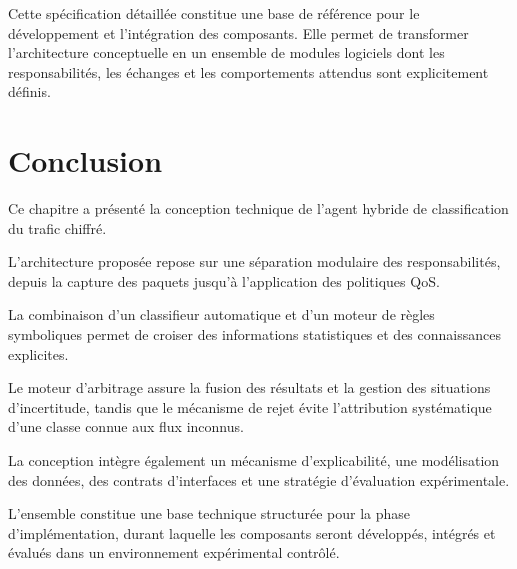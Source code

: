 Cette spécification détaillée constitue une base de référence pour le développement et l'intégration des composants. Elle permet de transformer l'architecture conceptuelle en un ensemble de modules logiciels dont les responsabilités, les échanges et les comportements attendus sont explicitement définis.


\section{Conclusion}

Ce chapitre a présenté la conception technique
de l'agent hybride de classification du trafic chiffré.

L'architecture proposée repose sur une séparation
modulaire des responsabilités, depuis la capture
des paquets jusqu'à l'application des politiques QoS.

La combinaison d'un classifieur automatique et
d'un moteur de règles symboliques permet de croiser
des informations statistiques et des connaissances
explicites.

Le moteur d'arbitrage assure la fusion des résultats
et la gestion des situations d'incertitude, tandis
que le mécanisme de rejet évite l'attribution
systématique d'une classe connue aux flux inconnus.

La conception intègre également un mécanisme
d'explicabilité, une modélisation des données,
des contrats d'interfaces et une stratégie
d'évaluation expérimentale.

L'ensemble constitue une base technique structurée
pour la phase d'implémentation, durant laquelle
les composants seront développés, intégrés et
évalués dans un environnement expérimental contrôlé.
